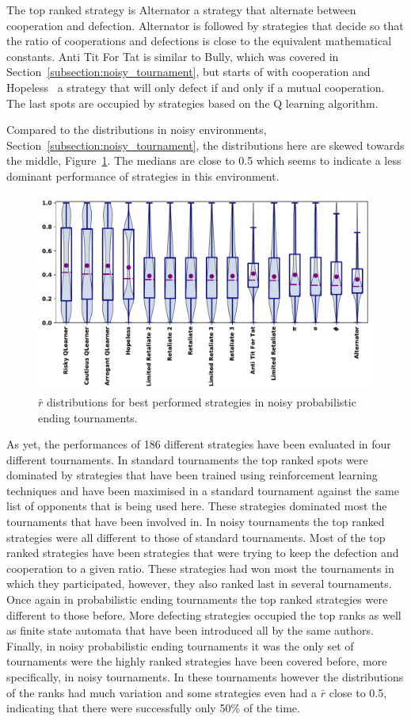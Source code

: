 \documentclass{article}
\begin{document}
The top ranked strategy is Alternator a strategy that alternate between
cooperation and defection. Alternator is followed by strategies that decide so
that the ratio of cooperations and defections is close to the equivalent
mathematical constants. Anti Tit For Tat is similar to Bully, which was covered
in Section~\ref{subsection:noisy_tournament}, but starts of with cooperation and
Hopeless~\cite{Van2015} a strategy that will only defect if and only if a mutual
cooperation. The last spots are occupied by strategies based on the Q learning
algorithm.

Compared to the distributions in noisy environments,
Section~\ref{subsection:noisy_tournament}, the distributions here are skewed
towards the middle, Figure~\ref{fig:noisy_probend_results}. The medians are
close to 0.5 which seems to indicate a less dominant performance of strategies
in this environment.

\begin{figure}[!htbp]
    \centering
    \includegraphics[width=.7\textwidth]{../images/performance_probend_noise.pdf}
    \caption{\(\bar{r}\) distributions for best performed strategies in noisy probabilistic ending tournaments.}
    \label{fig:noisy_probend_results}
\end{figure}

As yet, the performances of 186 different strategies have been evaluated in
four different tournaments. In standard tournaments the top ranked spots were
dominated by strategies that have been trained using reinforcement learning
techniques and have been maximised in a standard tournament against the same
list of opponents that is being used here. These strategies dominated most
the tournaments that have been involved in. In noisy tournaments the top ranked
strategies were all different to those of standard tournaments. Most of the
top ranked strategies have been strategies that were trying to keep the defection
and cooperation to a given ratio. These strategies had won most the tournaments
in which they participated, however, they also ranked last in several tournaments.
Once again in probabilistic ending tournaments the top ranked strategies were
different to those before. More defecting strategies occupied the top ranks
as well as finite state automata that have been introduced all by the same
authors. Finally, in noisy probabilistic ending tournaments it was the only
set of tournaments were the highly ranked strategies have been covered before,
more specifically, in noisy tournaments. In these tournaments however the
distributions of the ranks had much variation and some strategies even had
a $\bar{r}$ close to 0.5, indicating that there were successfully only 50\%
of the time.
\end{document}
